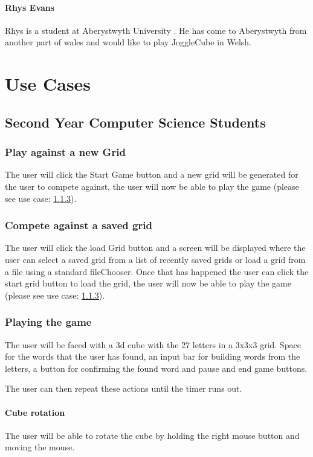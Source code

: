 \documentclass{project}
\begin{document}
		  \paragraph{Rhys Evans}  
		  	Rhys is a student at Aberystwyth University . He has come to Aberystwyth from another part of wales and would like to play JoggleCube in Welsh. 
	
	

\section{Use Cases}
	\subsection{Second Year Computer Science Students}
		\subsubsection{Play against a new Grid}
			The user will click the Start Game button and a new grid will be generated for 	the user to compete against, the user will now be able to play the game (please see use case: \ref{Playing the game}).
		\subsubsection{Compete against a saved grid}
			The user will click the load Grid button and a screen will be displayed where the user can select a saved grid from a list of recently saved grids or load a grid from a file using a standard fileChooser. Once that has happened the user can click the start grid button to load the grid, the user will now be able to play the game (please see use case: \ref{Playing the game}).
		
		\subsubsection{Playing the game} \label{Playing the game}
			The user will be faced with a 3d cube with the 27 letters in a 3x3x3 grid. Space for the words that the user has found, an input bar for building words from the letters, a button for confirming the found word and pause and end game buttons. 
			
			The user can then repeat these actions until the timer runs out.
			
			\paragraph{Cube rotation}
			The user will be able to rotate the cube by holding the right mouse button and moving the mouse.
\end{document}
